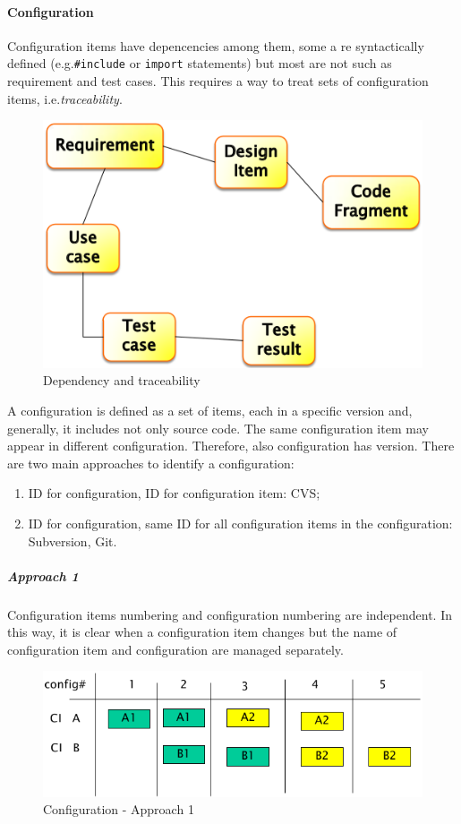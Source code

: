 \paragraph{Configuration}
Configuration items have depencencies among them, some a re syntactically defined (e.g.\@ \texttt{\#include} or \texttt{import} statements) but most are not such as requirement and test cases. This requires a way to treat sets of configuration items, i.e.\@ \emph{traceability}.

\begin{figure}[hbtp]
\centering
\includegraphics[scale=0.3]{images/dependency_traceability.png}
\caption{Dependency and traceability}
\end{figure}

A configuration is defined as a set of items, each in a specific version and, generally, it includes not only source code. The same configuration item may appear in different configuration. Therefore, also configuration has version. There are two main approaches to identify a configuration:
\begin{enumerate}
\item ID for configuration, ID for configuration item: CVS;
\item ID for configuration, same ID for all configuration items in the configuration: Subversion, Git.
\end{enumerate}

\subparagraph{Approach 1}
Configuration items numbering and configuration numbering are independent. In this way, it is clear when a configuration item changes but the name of configuration item and configuration are managed separately.

\begin{figure}[hbtp]
\centering
\includegraphics[scale=0.3]{images/configuration_approach1.png}
\caption{Configuration - Approach 1}
\end{figure}

